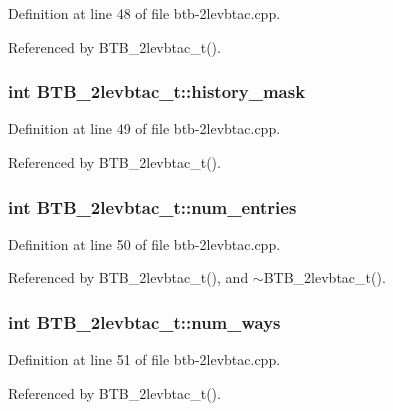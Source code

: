 Definition at line 48 of file btb-2levbtac.cpp.

Referenced by BTB\_\-2levbtac\_\-t().
\subsubsection[{history\_\-mask}]{\setlength{\rightskip}{0pt plus 5cm}int {\bf BTB\_\-2levbtac\_\-t::history\_\-mask}\hspace{0.3cm}{\tt  [protected]}}\label{classBTB__2levbtac__t_3d3adf1cba01e21f75d7652a777c140c}




Definition at line 49 of file btb-2levbtac.cpp.

Referenced by BTB\_\-2levbtac\_\-t().
\subsubsection[{num\_\-entries}]{\setlength{\rightskip}{0pt plus 5cm}int {\bf BTB\_\-2levbtac\_\-t::num\_\-entries}\hspace{0.3cm}{\tt  [protected]}}\label{classBTB__2levbtac__t_c4c548bee27a511196e224d9d31b144e}




Definition at line 50 of file btb-2levbtac.cpp.

Referenced by BTB\_\-2levbtac\_\-t(), and $\sim$BTB\_\-2levbtac\_\-t().
\subsubsection[{num\_\-ways}]{\setlength{\rightskip}{0pt plus 5cm}int {\bf BTB\_\-2levbtac\_\-t::num\_\-ways}\hspace{0.3cm}{\tt  [protected]}}\label{classBTB__2levbtac__t_9211c3f6209a88e888699affaf9baccc}




Definition at line 51 of file btb-2levbtac.cpp.

Referenced by BTB\_\-2levbtac\_\-t().

